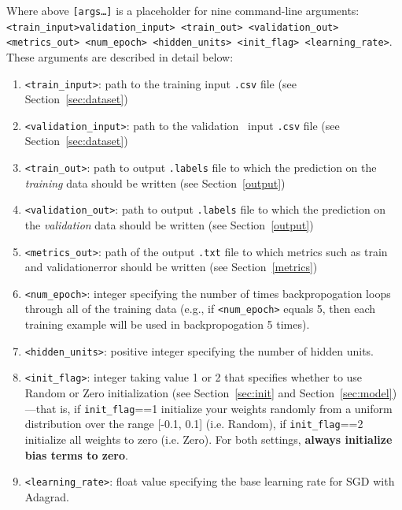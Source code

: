 \documentclass[11pt,addpoints,answers]{exam}
\begin{document}
Where above \texttt{[args\dots]} is a placeholder for nine command-line arguments: \texttt{<train\_input>}\newline \texttt{validation\_input> <train\_out> <validation\_out> <metrics\_out> <num\_epoch> \newline <hidden\_units>  <init\_flag> <learning\_rate>}. These arguments are described in detail below:
\begin{enumerate}
    \item \texttt{<train\_input>}: path to the training input \texttt{.csv} file (see Section~\ref{sec:dataset})
    \item \texttt{<validation\_input>}: path to the validation \ input \texttt{.csv} file (see Section~\ref{sec:dataset})
    \item \texttt{<train\_out>}: path to output \texttt{.labels} file to which the prediction on the \emph{training} data should be written (see Section~\ref{output})
    \item \texttt{<validation\_out>}: path to output \texttt{.labels} file to which the prediction on the \emph{validation} data should be written (see Section~\ref{output})
    \item \texttt{<metrics\_out>}: path of the output \texttt{.txt} file to which metrics such as train and validation\thinspace error should be written (see Section~\ref{metrics})
    \item \texttt{<num\_epoch>}: integer specifying the number of times backpropogation loops through all of the training data (e.g., if \texttt{<num\_epoch>} equals 5, then each training example will be used in backpropogation 5 times).
    \item \texttt{<hidden\_units>}: positive integer specifying the number of hidden units. 
    \item \texttt{<init\_flag>}: integer taking value 1 or 2 that specifies whether to use {\sc Random} or {\sc Zero} initialization (see Section~\ref{sec:init} and Section~\ref{sec:model})---that is, if \lstinline{init_flag}==1 initialize your weights randomly from a uniform distribution over the range [-0.1, 0.1] (i.e. {\sc Random}), if \lstinline{init_flag}==2 initialize all weights to zero (i.e. {\sc Zero}). For both settings, {\bf always initialize bias terms to zero}.
    \item \texttt{<learning\_rate>}: float value specifying the base learning rate for SGD with Adagrad.
    
\end{enumerate}
\end{document}
